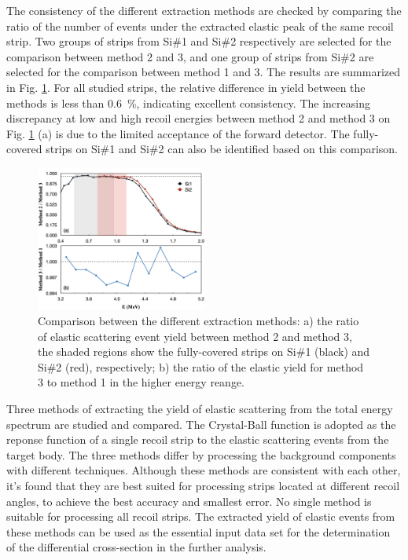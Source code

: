 \documentclass[fleqn,twocolumn,a4paper]{ikpar}
\begin{document}
The consistency of the different extraction methods are checked by comparing the
ratio of the number of events under the extracted elastic peak of the same recoil strip.
Two groups of strips from Si\#1 and Si\#2 respectively are selected for the
comparison between method 2 and 3, and one group of strips from Si\#2 are selected
for the comparison between method 1 and 3.
The results are summarized in Fig. \ref{fig:extraction_consistence}.
For all studied strips, the relative difference in yield between the methods is
less than \SI{0.6}{\percent}, indicating excellent consistency.
The increasing discrepancy at low and high recoil energies between method 2 and
method 3 on Fig. \ref{fig:extraction_consistence} (a) is due to the limited
acceptance of the forward detector.
The fully-covered strips on Si\#1 and Si\#2 can also be identified based on this comparison.
\begin{figure}[!htb]
	\includegraphics[width=0.5\textwidth]{./comparison_methods.png}
  \caption{Comparison between the different extraction
    methods: a) the ratio of elastic scattering event yield between method 2 and
    method 3, the shaded regions show the fully-covered strips on Si\#1
    (black) and Si\#2 (red), respectively; b) the ratio of the elastic yield for
    method 3 to method 1 in the higher energy reange.}
  \label{fig:extraction_consistence}
\end{figure}

\par
\medskip

Three methods of extracting the yield of elastic scattering from the total
energy spectrum are studied and compared.
The Crystal-Ball function is adopted as the reponse function of a single recoil strip to the
elastic scattering events from the target body.
The three methods differ by processing the background components with different techniques.
Although these methods are consistent with each other, it's found that they are best suited for
processing strips located at different recoil angles, to achieve the best accuracy
and smallest error.
No single method is suitable for processing all recoil strips.
The extracted yield of elastic events from these methods can be used as
the essential input data set for the determination of the differential cross-section in the further analysis.
\end{document}
